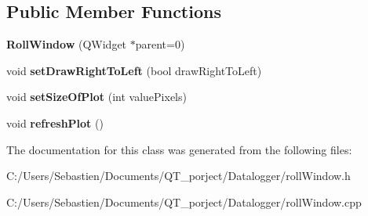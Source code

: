 \subsection*{Public Member Functions}
\begin{DoxyCompactItemize}
\item 
\mbox{\label{class_roll_window_a13bf8ce2de16e459b4d55700d00ff60a}} 
{\bfseries Roll\+Window} (Q\+Widget $\ast$parent=0)
\item 
\mbox{\label{class_roll_window_ab3ef8e3836b153b590422bf79d6c0cef}} 
void {\bfseries set\+Draw\+Right\+To\+Left} (bool draw\+Right\+To\+Left)
\item 
\mbox{\label{class_roll_window_a20a2169e2aab419fb403fc9285a1e35a}} 
void {\bfseries set\+Size\+Of\+Plot} (int value\+Pixels)
\item 
\mbox{\label{class_roll_window_a2ab5bd32d885dfa84389e346753f04cc}} 
void {\bfseries refresh\+Plot} ()
\end{DoxyCompactItemize}


The documentation for this class was generated from the following files\+:\begin{DoxyCompactItemize}
\item 
C\+:/\+Users/\+Sebastien/\+Documents/\+Q\+T\+\_\+porject/\+Datalogger/roll\+Window.\+h\item 
C\+:/\+Users/\+Sebastien/\+Documents/\+Q\+T\+\_\+porject/\+Datalogger/roll\+Window.\+cpp\end{DoxyCompactItemize}
